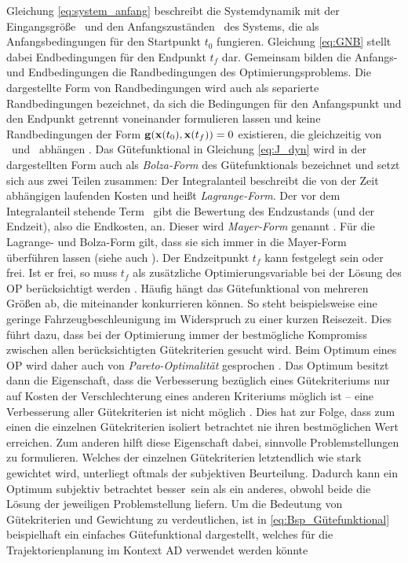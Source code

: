 Gleichung \eqref{eq:system_anfang} beschreibt die Systemdynamik mit der Eingangsgröße \uoft~und den Anfangszuständen \xzero~des Systems, die als Anfangsbedingungen für den Startpunkt $t_0$ fungieren. Gleichung \eqref{eq:GNB} stellt dabei Endbedingungen für den Endpunkt $t_f$ dar. Gemeinsam bilden die Anfangs- und Endbedingungen die Randbedingungen des Optimierungsproblems. Die dargestellte Form von Randbedingungen wird auch als separierte Randbedingungen bezeichnet, da sich die Bedingungen für den Anfangspunkt und den Endpunkt getrennt voneinander formulieren lassen und keine Randbedingungen der Form $\boldsymbol{\mathrm{g}}(\boldsymbol{\mathrm{x}}(t_0),\boldsymbol{\mathrm{x}}(t_f))=0$ existieren, die gleichzeitig von \xoftzero~und \xoftf~abhängen \cite{Cash.1980}. Das Gütefunktional in Gleichung \eqref{eq:J_dyn} wird in der dargestellten Form auch als \textit{Bolza-Form} des Gütefunktionals bezeichnet und setzt sich aus zwei Teilen zusammen: Der Integralanteil beschreibt die von der Zeit abhängigen laufenden Kosten und heißt \textit{Lagrange-Form}. Der vor dem Integralanteil stehende Term \Vofxoftf~gibt die Bewertung des Endzustands (und der Endzeit), also die Endkosten, an. Dieser wird \textit{Mayer-Form} genannt \cite{KnutGraichen.2012}. Für die Lagrange- und Bolza-Form gilt, dass sie sich immer in die Mayer-Form überführen lassen \cite{KnutGraichen.2012} (siehe auch \cite{Gerdts.2010}). Der Endzeitpunkt $t_f$ kann festgelegt sein oder frei. Ist er frei, so muss $t_f$ als zusätzliche Optimierungsvariable bei der Lösung des \gls{OP} berücksichtigt werden \cite{KnutGraichen.2012}. Häufig hängt das Gütefunktional von mehreren Größen ab, die miteinander konkurrieren können. So steht beispielsweise eine geringe Fahrzeugbeschleunigung im Widerspruch zu einer kurzen Reisezeit. Dies führt dazu, dass bei der Optimierung immer der bestmögliche Kompromiss zwischen allen berücksichtigten Gütekriterien gesucht wird. Beim Optimum eines \gls{OP} wird daher auch von \textit{Pareto-Optimalität} gesprochen \cite{Papageorgiou.2012}. Das Optimum besitzt dann die Eigenschaft, dass die Verbesserung bezüglich eines Gütekriteriums nur auf Kosten der Verschlechterung eines anderen Kriteriums möglich ist -- eine Verbesserung aller Gütekriterien ist nicht möglich \cite{Papageorgiou.2012}. Dies hat zur Folge, dass zum einen die einzelnen Gütekriterien isoliert betrachtet nie ihren bestmöglichen Wert erreichen. Zum anderen hilft diese Eigenschaft dabei, sinnvolle Problemstellungen zu formulieren. Welches der einzelnen Gütekriterien letztendlich wie stark gewichtet wird, unterliegt oftmals der subjektiven Beurteilung. Dadurch kann ein Optimum subjektiv betrachtet \glqq besser\grqq~sein als ein anderes, obwohl beide die Lösung der jeweiligen Problemstellung liefern. Um die Bedeutung von Gütekriterien und Gewichtung zu verdeutlichen, ist in \eqref{eq:Bsp_Gütefunktional} beispielhaft ein einfaches Gütefunktional dargestellt, welches für die Trajektorienplanung im Kontext \gls{AD} verwendet werden könnte 
